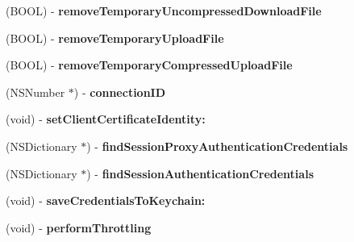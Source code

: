 \begin{DoxyCompactItemize}
\item 
\hypertarget{interface_a_s_i_h_t_t_p_request_af8ef43877926d01b8a51abb62dd2e208}{
(\-B\-O\-O\-L) -\/ {\bfseries remove\-Temporary\-Uncompressed\-Download\-File}}
\label{interface_a_s_i_h_t_t_p_request_af8ef43877926d01b8a51abb62dd2e208}

\item 
\hypertarget{interface_a_s_i_h_t_t_p_request_aaf8e3adbbf00110b67232158921553c0}{
(\-B\-O\-O\-L) -\/ {\bfseries remove\-Temporary\-Upload\-File}}
\label{interface_a_s_i_h_t_t_p_request_aaf8e3adbbf00110b67232158921553c0}

\item 
\hypertarget{interface_a_s_i_h_t_t_p_request_a4f8b19d66be57ffad0d6128182c98414}{
(\-B\-O\-O\-L) -\/ {\bfseries remove\-Temporary\-Compressed\-Upload\-File}}
\label{interface_a_s_i_h_t_t_p_request_a4f8b19d66be57ffad0d6128182c98414}

\item 
\hypertarget{interface_a_s_i_h_t_t_p_request_a3e06c0a51784d32cc8198f616e63c530}{
(\-N\-S\-Number $\ast$) -\/ {\bfseries connection\-I\-D}}
\label{interface_a_s_i_h_t_t_p_request_a3e06c0a51784d32cc8198f616e63c530}

\item 
\hypertarget{interface_a_s_i_h_t_t_p_request_a4f24e48396e06b8a81de111e19c1314a}{
(void) -\/ {\bfseries set\-Client\-Certificate\-Identity\-:}}
\label{interface_a_s_i_h_t_t_p_request_a4f24e48396e06b8a81de111e19c1314a}

\item 
\hypertarget{interface_a_s_i_h_t_t_p_request_a480d62ba0d9ba8d1a64b25b45fb2d965}{
(\-N\-S\-Dictionary $\ast$) -\/ {\bfseries find\-Session\-Proxy\-Authentication\-Credentials}}
\label{interface_a_s_i_h_t_t_p_request_a480d62ba0d9ba8d1a64b25b45fb2d965}

\item 
\hypertarget{interface_a_s_i_h_t_t_p_request_a0f38ffc0ae199e83262895f640c9c263}{
(\-N\-S\-Dictionary $\ast$) -\/ {\bfseries find\-Session\-Authentication\-Credentials}}
\label{interface_a_s_i_h_t_t_p_request_a0f38ffc0ae199e83262895f640c9c263}

\item 
\hypertarget{interface_a_s_i_h_t_t_p_request_a3a57684f5aba49781ec3c9c9ef1516a6}{
(void) -\/ {\bfseries save\-Credentials\-To\-Keychain\-:}}
\label{interface_a_s_i_h_t_t_p_request_a3a57684f5aba49781ec3c9c9ef1516a6}

\item 
\hypertarget{interface_a_s_i_h_t_t_p_request_a510b47cc1be0b9c1968a9c8cc3859038}{
(void) -\/ {\bfseries perform\-Throttling}}
\label{interface_a_s_i_h_t_t_p_request_a510b47cc1be0b9c1968a9c8cc3859038}


\end{DoxyCompactItemize}
